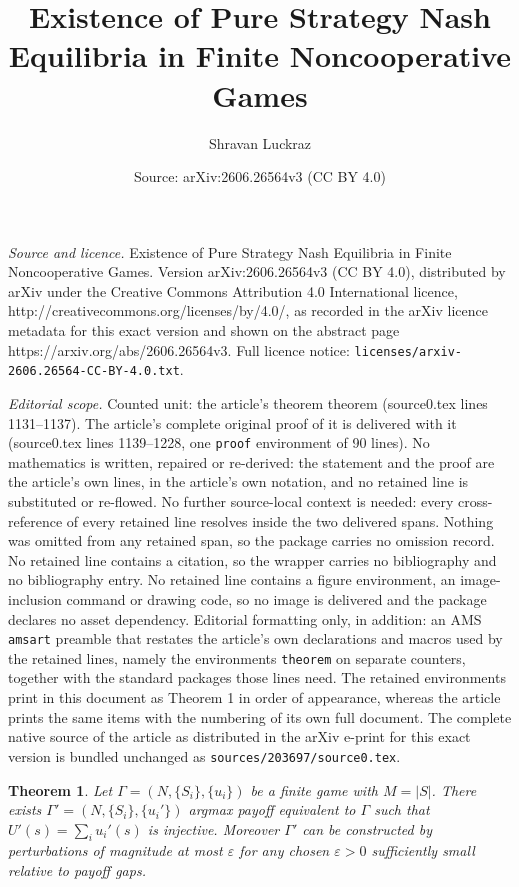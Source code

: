 \documentclass[10pt,a4paper]{amsart}
\title{Existence of Pure Strategy Nash Equilibria in Finite Noncooperative Games}
\author{Shravan Luckraz}
\date{Source: arXiv:2606.26564v3 (CC BY 4.0)}
\newtheorem{theorem}{Theorem}
\begin{document}
\maketitle

\noindent\emph{Source and licence.} Existence of Pure Strategy Nash Equilibria in Finite Noncooperative Games. Version arXiv:2606.26564v3 (CC BY 4.0), distributed by arXiv under the Creative Commons Attribution 4.0 International licence, http://creativecommons.org/licenses/by/4.0/, as recorded in the arXiv licence metadata for this exact version and shown on the abstract page https://arxiv.org/abs/2606.26564v3. Full licence notice: \texttt{licenses/arxiv-2606.26564-CC-BY-4.0.txt}.\par\smallskip

\noindent\textit{Editorial scope.} Counted unit: the article's theorem theorem (source0.tex lines 1131--1137). The article's complete original proof of it is delivered with it (source0.tex lines 1139--1228, one \texttt{proof} environment of 90 lines). No mathematics is written, repaired or re-derived: the statement and the proof are the article's own lines, in the article's own notation, and no retained line is substituted or re-flowed.  No further source-local context is needed: every cross-reference of every retained line resolves inside the two delivered spans.  Nothing was omitted from any retained span, so the package carries no omission record.  No retained line contains a citation, so the wrapper carries no bibliography and no bibliography entry.  No retained line contains a figure environment, an image-inclusion command or drawing code, so no image is delivered and the package declares no asset dependency.  Editorial formatting only, in addition: an AMS \texttt{amsart} preamble that restates the article's own declarations and macros used by the retained lines, namely the environments \texttt{theorem} on separate counters, together with the standard packages those lines need.  The retained environments print in this document as Theorem 1 in order of appearance, whereas the article prints the same items with the numbering of its own full document.  The complete native source of the article as distributed in the arXiv e-print for this exact version is bundled unchanged as \texttt{sources/203697/source0.tex}.
\begin{theorem}
Let \(\Gamma=(N,\{S_i\},\{u_i\})\) be a finite game with \(M=|S|\). There
exists \(\Gamma'=(N,\{S_i\},\{u_i'\})\) argmax payoff equivalent to \(\Gamma\)
such that \(U'(s)=\sum_i u_i'(s)\) is injective. Moreover \(\Gamma'\) can be
constructed by perturbations of magnitude at most \(\varepsilon\) for any
chosen \(\varepsilon>0\) sufficiently small relative to payoff gaps.
\end{theorem}
\end{document}

